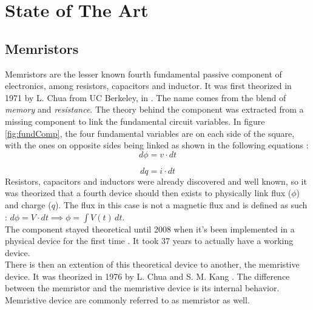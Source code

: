 \section{State of The Art}
\label{sec:int_state}

\subsection{Memristors}\label{subsec:memristors}

Memristors are the lesser known fourth fundamental passive component of electronics, among resistors, capacitors and inductor.
It was first theorized in 1971 by L. Chua from UC Berkeley, in \cite{TheoMemristor}. The name comes from the blend of \textit{memory} and \textit{resistance}.
The theory behind the component was extracted from a missing component to link the fundamental circuit variables. In figure \ref{fig:fundComp}, the four fundamental variables are on each side of the square, with the ones on opposite sides being linked as shown in the following equations :
\begin{equation}
    d\phi = v\cdot dt
\end{equation}

\begin{equation}
    dq = i\cdot dt
\end{equation}
Resistors, capacitors and inductors were already discovered and well known, so it was theorized that a fourth device should then exists to physically link flux ($\phi$) and charge ($q$).  The flux in this case is not a magnetic flux and is defined as such : $ d\phi=V\cdot dt \implies \phi =  \int V(t) \,dt  $.\\
The component stayed theoretical until 2008 when it's been implemented in a physical device for the first time \cite{Strukov2008}. It took 37 years to actually have a working device.\\
There is then an extention of this theoretical device to another, the memristive device. It was theorized in 1976 by L. Chua and S. M. Kang \cite{memrestiveDev}. The difference between the memristor and the memristive device is its internal behavior. Memristive device are commonly referred to as memristor as well. 

